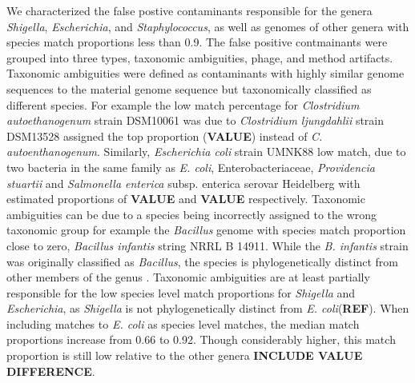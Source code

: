 \documentclass[fleqn,10pt,lineno]{wlpeerj}\usepackage[]{graphicx}\usepackage[]{color}
\begin{document}
We characterized the false postive contaminants responsible for the genera \textit{Shigella}, \textit{Escherichia}, and \textit{Staphylococcus}, as well as genomes of other genera with species match proportions less than 0.9. 
The false positive contmainants were grouped into three types, taxonomic ambiguities, phage, and method artifacts.  
Taxonomic ambiguities were defined as contaminants with highly similar genome sequences to the material genome sequence but taxonomically classified as different species. 
For example the low match percentage for \textit{Clostridium autoethanogenum} strain DSM10061 was due to  \textit{Clostridium ljungdahlii} strain DSM13528 assigned the top proportion (\textbf{VALUE}) instead of \textit{C. autoenthanogenum}. 
Similarly, \textit{Escherichia coli} strain UMNK88 low match, due to two bacteria in the same family as \textit{E. coli}, 
Enterobacteriaceae, \textit{Providencia stuartii} and \textit{Salmonella enterica} subsp. enterica serovar Heidelberg with estimated proportions of \textbf{VALUE} and \textbf{VALUE} respectively. 
Taxonomic ambiguities can be due to a species being incorrectly assigned to the wrong taxonomic group for example the \textit{Bacillus} genome with species match proportion close to zero, \textit{Bacillus infantis} string NRRL B 14911. 
While the \textit{B. infantis} strain was originally classified as \textit{Bacillus}, the species is phylogenetically distinct from other members of the genus \citep{ko2006bacillus}. 
Taxonomic ambiguities are at least partially responsible for the low species level match proportions for  \textit{Shigella} and \textit{Escherichia}, as \textit{Shigella} is not phylogenetically distinct from \textit{E. coli}(\textbf{REF}).
When including matches to \textit{E. coli} as species level matches, the median match proportions increase from 0.66 to 0.92. 
Though considerably higher, this match proportion is still low relative to the other genera \textbf{INCLUDE VALUE DIFFERENCE}.  

\end{document}
